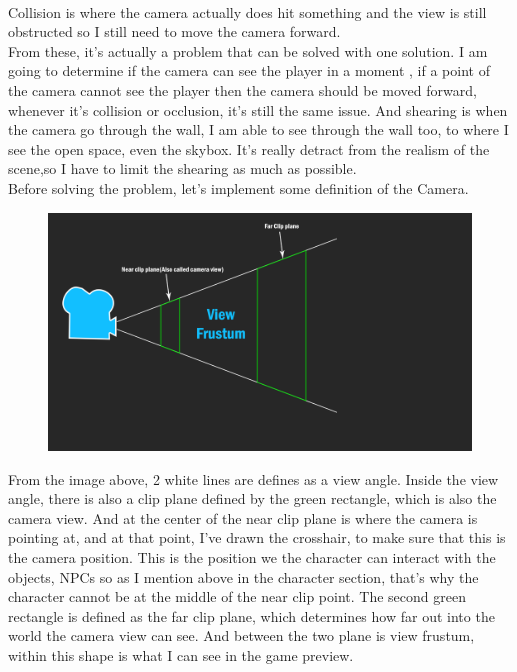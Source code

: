 \documentclass[a4paper, 13pt]{extarticle}
\begin{document}
 \\[0.05cm]
  Collision is where the camera actually does hit something and the view is still obstructed so I still need to move the camera forward. 
  \\[0.05cm] From these, it's actually a problem that can be solved with one solution. I am going to determine if the camera can see the player in a moment , if a point of the camera cannot see the player then the camera should be moved forward, whenever it's collision or occlusion, it's still the same issue. And shearing is when the camera go through the wall, I am able to see through the wall too, to where I see the open space, even the skybox. It's really detract from the realism of the scene,so I have to limit the shearing as much as possible.  	
  \\[0.15cm]
  Before solving the problem, let's implement some definition of the Camera.
  \newpage
  \begin{figure}[h]
  	\centering
  	\begin{minipage}{.4\textwidth}
  		\centering
  		\includegraphics[width=1.7\linewidth]{intructions/Camera_overview.png}
  		\centering
  		\label{fig:test12}
  	\end{minipage}
  \end{figure} 
From the image above, 2 white lines are defines as a view angle. Inside the view angle, there is also a clip plane defined by the green rectangle, which is also the camera view. And at the center of the near clip plane is where the camera is pointing at, and at that point, I've drawn the crosshair, to make sure that this is the camera position. This is the position we the character can interact with the objects, NPCs so as I mention above in the character section, that's why the character cannot be at the middle of the near clip point. The second green rectangle is defined as the far clip plane, which determines how far out into the world the camera view can see. And between the two plane is view frustum, within this shape is what I can see in the game preview.
\end{document}
